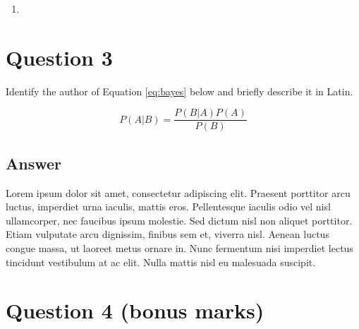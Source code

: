 \documentclass[
	12pt, %
]{../Template/fphw}
\begin{document}
\begin{enumerate}[label = (\alph*)]
	\item 
\end{enumerate}


\section*{Question 3}

\begin{problem}
	Identify the author of Equation \ref{eq:bayes} below and briefly describe it in Latin.
	
	\medskip
	
	\begin{equation}\label{eq:bayes}
		P(A|B) = \frac{P(B|A)P(A)}{P(B)}
	\end{equation}
	
	\smallskip
\end{problem}


\subsection*{Answer} 

Lorem ipsum dolor sit amet, consectetur adipiscing elit. Praesent porttitor arcu luctus, imperdiet urna iaculis, mattis eros. Pellentesque iaculis odio vel nisl ullamcorper, nec faucibus ipsum molestie. Sed dictum nisl non aliquet porttitor. Etiam vulputate arcu dignissim, finibus sem et, viverra nisl. Aenean luctus congue massa, ut laoreet metus ornare in. Nunc fermentum nisi imperdiet lectus tincidunt vestibulum at ac elit. Nulla mattis nisl eu malesuada suscipit.


\section*{Question 4 (bonus marks)}
\end{document}
